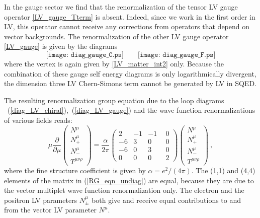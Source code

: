 \documentclass[12pt]{revtex4}
\begin{document}
In the gauge sector we find that the renormalization of the tensor LV
gauge operator \eqref{LV_gauge_Tterm} is absent. 
Indeed, since we work in the first order in
LV, this operator cannot receive any corrections from operators that
depend on vector backgrounds. The renormalization of the other LV
gauge operator \eqref{LV_gauge} is given by the diagrams
\begin{equation} 
\label{diag_LV_gauge}
\texttt{[image: diag\_gauge\_C.ps]} 
\qquad 
\texttt{[image: diag\_gauge\_F.ps]}
\end{equation} 
where the vertex is again given by \eqref{LV_matter_int2}
only. Because the combination of these gauge self energy diagrams is
only logarithmically divergent, the dimension three LV Chern-Simons
term cannot be generated by LV in SQED.   

The resulting renormalization group equation due to the loop diagrams 
~(\ref{diag_LV_chiral}),~(\ref{diag_LV_gauge}) and the wave function
renormalizations of various fields reads:
\begin{equation}
\label{RG_eqn_undiag}
     \mu \frac{\partial}
              {\partial\mu} 
                \left(
\begin{array}{c}
                   N^\mu \\ 
   N_+^\mu \\
                   N_{-}^\mu \\
   T^{\mu\nu\rho}
                \end{array} \right) = 
     \frac{\alpha}
          {2 \pi} 
     \left(\begin{array}{rrrr}
                    2 & -1 & -1 & ~~0 \\
   -6 &  3 &  0 & ~~0 \\
                   -6 &  0 &  3 & ~~0 \\
    0 &  0 &  0 & ~~2
           \end{array}\right)
     \left(
  \begin{array}{c}
                 N^\mu \\ 
 N_+^\mu \\
                 N_{-}^\mu \\
 T^{\mu\nu\rho}
          \end{array} \right)~,
\end{equation}
where the fine structure coefficient is given by $\alpha =
e^2/(4\pi)$. The (1,1) and (4,4) elements of the matrix in
(\ref{RG_eqn_undiag}) are equal, because they are due to the vector 
multiplet wave function renormalization only. The electron and the
positron LV parameters $N_\pm^\mu$ both give and receive equal
contributions to and from the vector LV parameter $N^\mu$. 
\end{document}
